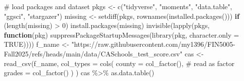 \documentclass[
  12pt,
  a4paper,
]{scrbook}
\newenvironment{Shaded}{\begin{snugshade}}{\end{snugshade}}
\newcommand{\AttributeTok}[1]{\textcolor[rgb]{0.40,0.45,0.13}{#1}}
\newcommand{\CommentTok}[1]{\textcolor[rgb]{0.37,0.37,0.37}{#1}}
\newcommand{\ConstantTok}[1]{\textcolor[rgb]{0.56,0.35,0.01}{#1}}
\newcommand{\ControlFlowTok}[1]{\textcolor[rgb]{0.00,0.23,0.31}{\textbf{#1}}}
\newcommand{\DecValTok}[1]{\textcolor[rgb]{0.68,0.00,0.00}{#1}}
\newcommand{\FunctionTok}[1]{\textcolor[rgb]{0.28,0.35,0.67}{#1}}
\newcommand{\NormalTok}[1]{\textcolor[rgb]{0.00,0.23,0.31}{#1}}
\newcommand{\OtherTok}[1]{\textcolor[rgb]{0.00,0.23,0.31}{#1}}
\newcommand{\SpecialCharTok}[1]{\textcolor[rgb]{0.37,0.37,0.37}{#1}}
\newcommand{\StringTok}[1]{\textcolor[rgb]{0.13,0.47,0.30}{#1}}
\theoremstyle{plain}
\theoremstyle{definition}
\theoremstyle{remark}
\begin{document}
\begin{Shaded}
\begin{Highlighting}[]
\CommentTok{\# load packages and dataset}
\NormalTok{pkgs }\OtherTok{\textless{}{-}} \FunctionTok{c}\NormalTok{(}\StringTok{"tidyverse"}\NormalTok{, }\StringTok{"moments"}\NormalTok{, }\StringTok{"data.table"}\NormalTok{, }\StringTok{"ggsci"}\NormalTok{, }\StringTok{"stargazer"}\NormalTok{)}
\NormalTok{missing }\OtherTok{\textless{}{-}} \FunctionTok{setdiff}\NormalTok{(pkgs, }\FunctionTok{rownames}\NormalTok{(}\FunctionTok{installed.packages}\NormalTok{()))}
\ControlFlowTok{if}\NormalTok{ (}\FunctionTok{length}\NormalTok{(missing) }\SpecialCharTok{\textgreater{}} \DecValTok{0}\NormalTok{) }\FunctionTok{install.packages}\NormalTok{(missing)}
\FunctionTok{invisible}\NormalTok{(}\FunctionTok{lapply}\NormalTok{(pkgs, }\ControlFlowTok{function}\NormalTok{(pkg) }\FunctionTok{suppressPackageStartupMessages}\NormalTok{(}\FunctionTok{library}\NormalTok{(pkg, }\AttributeTok{character.only =} \ConstantTok{TRUE}\NormalTok{))))}
\NormalTok{f\_name }\OtherTok{\textless{}{-}} \StringTok{"https://raw.githubusercontent.com/my1396/FIN5005{-}Fall2025/refs/heads/main/data/CASchools\_test\_score.csv"}
\NormalTok{cas }\OtherTok{\textless{}{-}} \FunctionTok{read\_csv}\NormalTok{(f\_name,}
    \AttributeTok{col\_types =} \FunctionTok{cols}\NormalTok{(}
        \AttributeTok{county =} \FunctionTok{col\_factor}\NormalTok{(), }\CommentTok{\# read as factor}
        \AttributeTok{grades =} \FunctionTok{col\_factor}\NormalTok{()}
\NormalTok{    )}
\NormalTok{)}
\NormalTok{cas }\SpecialCharTok{\%\textgreater{}\%} \FunctionTok{as.data.table}\NormalTok{()}
\end{Highlighting}
\end{Shaded}
\end{document}
